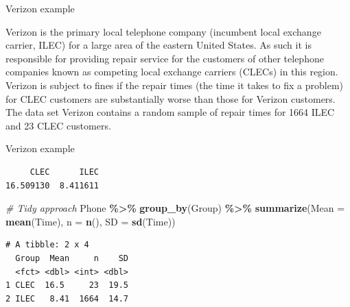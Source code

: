 \documentclass[
  ignorenonframetext,
]{beamer}
\newenvironment{Shaded}{\begin{snugshade}}{\end{snugshade}}
\newcommand{\AttributeTok}[1]{\textcolor[rgb]{0.13,0.29,0.53}{#1}}
\newcommand{\CommentTok}[1]{\textcolor[rgb]{0.56,0.35,0.01}{\textit{#1}}}
\newcommand{\FunctionTok}[1]{\textcolor[rgb]{0.13,0.29,0.53}{\textbf{#1}}}
\newcommand{\NormalTok}[1]{#1}
\newcommand{\OtherTok}[1]{\textcolor[rgb]{0.56,0.35,0.01}{#1}}
\newcommand{\SpecialCharTok}[1]{\textcolor[rgb]{0.81,0.36,0.00}{\textbf{#1}}}
\begin{document}
\begin{frame}{Verizon example}
\protect\hypertarget{verizon-example}{}
\begin{tcolorbox}
Verizon is the primary local telephone company (incumbent local exchange carrier, ILEC) for a large area of the eastern United States. As such it is responsible for providing repair service for the customers of other telephone companies known as competing local exchange carriers (CLECs) in this region. Verizon is subject to fines if the repair times (the time it takes to fix a problem) for CLEC customers are substantially worse than those for Verizon customers. The data set Verizon contains a random sample of repair times for 1664 ILEC and 23 CLEC customers.
\end{tcolorbox}
\end{frame}

\begin{frame}[fragile]{Verizon example}
\protect\hypertarget{verizon-example-1}{}
\tiny

\begin{Shaded}
\end{Shaded}

\begin{verbatim}
     CLEC      ILEC 
16.509130  8.411611 
\end{verbatim}

\begin{Shaded}
\begin{Highlighting}[]
\CommentTok{\# Tidy approach}
\NormalTok{Phone }\SpecialCharTok{\%\textgreater{}\%} 
  \FunctionTok{group\_by}\NormalTok{(Group) }\SpecialCharTok{\%\textgreater{}\%} 
  \FunctionTok{summarize}\NormalTok{(}\AttributeTok{Mean =} \FunctionTok{mean}\NormalTok{(Time), }\AttributeTok{n =} \FunctionTok{n}\NormalTok{(), }\AttributeTok{SD =} \FunctionTok{sd}\NormalTok{(Time))}
\end{Highlighting}
\end{Shaded}

\begin{verbatim}
# A tibble: 2 x 4
  Group  Mean     n    SD
  <fct> <dbl> <int> <dbl>
1 CLEC  16.5     23  19.5
2 ILEC   8.41  1664  14.7
\end{verbatim}

\normalsize
\end{frame}
\end{document}
